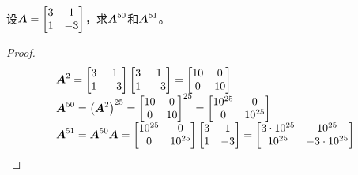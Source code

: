 \begin{problem}\label{problem-1.3}
设\(\boldsymbol{A}=\begin{bmatrix}3&1\\1&-3\end{bmatrix}\)，求\(\boldsymbol{A}^{50}\)和\(\boldsymbol{A}^{51}\)。
\end{problem}
\begin{proof}
    \begin{equation*}
        \begin{array}{lll}
            \boldsymbol{A}^2=\begin{bmatrix}3&1\\1&-3\end{bmatrix}\begin{bmatrix}3&1\\1&-3\end{bmatrix}=\begin{bmatrix}10&0\\0&10\end{bmatrix}      \\
            \boldsymbol{A}^{50}=\left( \boldsymbol{A}^2 \right)^{25}={\begin{bmatrix}10&0\\0&10\end{bmatrix}}^{25}=\begin{bmatrix}10^{25}&0\\0&10^{25}\end{bmatrix} \\
            \boldsymbol{A}^{51}=\boldsymbol{A}^{50}\boldsymbol{A}=\begin{bmatrix}10^{25}&0\\0&10^{25}\end{bmatrix}\begin{bmatrix}3&1\\1&-3\end{bmatrix}=\begin{bmatrix}3\cdot10^{25}&10^{25}\\10^{25}&-3\cdot10^{25}\end{bmatrix}
        \end{array}
    \end{equation*}
\end{proof}

